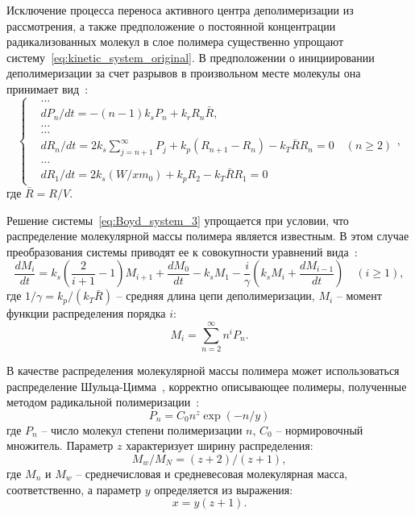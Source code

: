 Исключение процесса переноса активного центра деполимеризации из рассмотрения, а также предположение о постоянной концентрации радикализованных молекул в слое полимера существенно упрощают систему~\ref{eq:kinetic_system_original}. В предположении о инициировании деполимеризации за счет разрывов в произвольном месте молекулы она принимает вид~\cite{Boyd_3}:
\begin{equation} \label{eq:Boyd_system_3}
	\left\{
	\begin{aligned}
		&\dots \\
		&d P_n / d t=-(n-1) k_s P_n+k_r R_n \bar{R}, \\
		&\dots \\
		&\dots \\
		&d R_n / d t=2 k_s \sum_{j=n+1}^{\infty} P_j+k_p\left(R_{n+1}-R_n\right)-k_T \bar{R} R_n=0 \quad(n \geq 2) \\
		&\dots \\
		&d R_1 / d t=2 k_s\left(W / x m_0\right)+k_p R_2-k_T \bar{R} R_1=0
	\end{aligned}
	\right.,
\end{equation}
где $\bar{R} = R/V$.

Решение системы~\ref{eq:Boyd_system_3} упрощается при условии, что распределение молекулярной массы полимера является известным. В этом случае преобразования системы приводят ее к совокупности уравнений вида~\cite{Boyd_3}:
\begin{equation} \label{eq:moment_equation}
	\frac{d M_i}{d t}=k_s\left(\frac{2}{i+1}-1\right) M_{i+1}+\frac{d M_0}{d t}-k_s M_1 - \frac{i}{\gamma}\left(k_s M_i+\frac{d M_{i-1}}{d t}\right) \quad(i \geq 1),
\end{equation}
где $1/\gamma = k_p / (k_T \bar{R})$ -- средняя длина цепи деполимеризации, $M_i$ -- момент функции распределения порядка $i$:
\begin{equation}
	M_i=\sum_{n=2}^{\infty} n^i P_n.
\end{equation}

В качестве распределения молекулярной массы полимера может использоваться распределение Шульца-Цимма~\cite{Boyd_3, Schulz-Zimm_distribution}, корректно описывающее полимеры, полученные методом радикальной полимеризации~\cite{Schulz-Zimm_distribution_proof}:
\begin{equation} \label{eq:Schulz-Zimm_distribution}
	P_n = C_0 n^z \exp (-n/y)
\end{equation}
где $P_n$ -- число молекул степени полимеризации $n$, $C_0$ -- нормировочный множитель. Параметр $z$ характеризует ширину распределения:
\begin{equation}
	M_w / M_N=(z+2) /(z+1),
\end{equation}
где $M_n$ и $M_w$ -- среднечисловая и средневесовая молекулярная масса, соответственно, а параметр $y$ определяется из выражения:
\begin{equation}
	x=y(z+1).
\end{equation}

